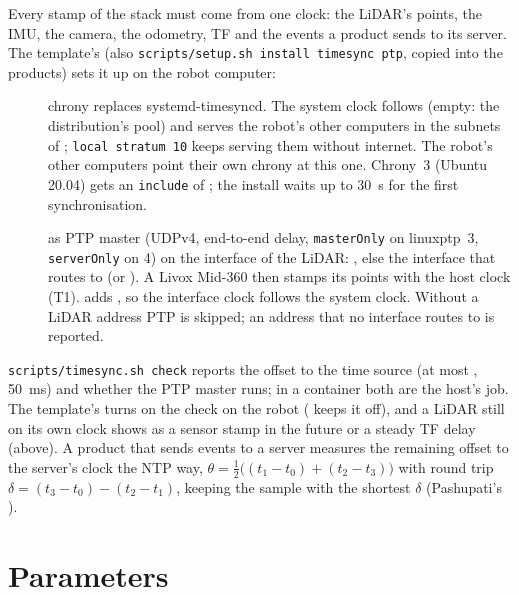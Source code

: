 Every stamp of the stack must come from one clock: the LiDAR's points, the IMU, the camera, the
odometry, TF and the events a product sends to its server. The template's
 (also \texttt{scripts/setup.sh install timesync ptp}, copied into the
products) sets it up on the robot computer:
\begin{description}
  \item[] chrony replaces systemd-timesyncd. The system clock follows
     (empty: the distribution's pool) and serves the robot's other computers in
    the subnets of ; \texttt{local stratum 10} keeps serving them without
    internet. The robot's other computers point their own chrony at this one. Chrony~3 (Ubuntu
    20.04) gets an \texttt{include} of ; the install waits up to 30~s for
    the first synchronisation.
  \item[]  as PTP master (UDPv4, end-to-end delay, \texttt{masterOnly} on
    linuxptp~3, \texttt{serverOnly} on 4) on the interface of the LiDAR: , else the
    interface that routes to  (or ). A Livox Mid-360 then stamps its
    points with the host clock (T1).  adds , so the
    interface clock follows the system clock. Without a LiDAR address PTP is skipped; an address
    that no interface routes to is reported.
\end{description}
\texttt{scripts/timesync.sh check} reports the offset to the time source (at most
, 50~ms) and whether the PTP master runs; in a container both are the host's
job. The template's  turns on the  check on the robot
( keeps it off), and a LiDAR still on its own clock shows as a sensor stamp in the
future or a steady TF delay (above). A product that sends events to a server measures the
remaining offset to the server's clock the NTP way, $\theta = \tfrac{1}{2}\big((t_1 - t_0) + (t_2 -
t_3)\big)$ with round trip $\delta = (t_3 - t_0) - (t_2 - t_1)$, keeping the sample with the
shortest $\delta$ (Pashupati's ).

\section{Parameters}

\readonlynote


